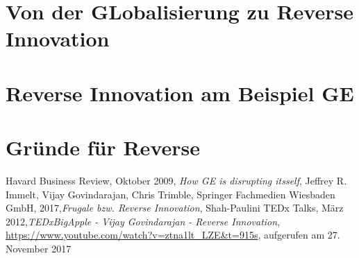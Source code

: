 \documentclass[a4paper,11pt]{scrartcl}
\begin{document}
\section{Von der GLobalisierung zu Reverse Innovation}




\section{Reverse Innovation am Beispiel GE}





\subsection{}




\section{Gründe für Reverse}



\newpage
\begin{thebibliography}{1}

Havard Business Review, Oktober  2009, \textit{How GE is disrupting itsself}, Jeffrey R. Immelt, Vijay Govindarajan, Chris Trimble, 
Springer Fachmedien Wiesbaden GmbH, 2017,\textit{Frugale bzw. Reverse Innovation}, Shah-Paulini
TEDx Talks, März 2012,\textit{TEDxBigApple - Vijay Govindarajan - Reverse Innovation}, \url{https://www.youtube.com/watch?v=ztna1lt_LZE&t=915s}, aufgerufen am 27. November 2017


\end{thebibliography}
\end{document}
